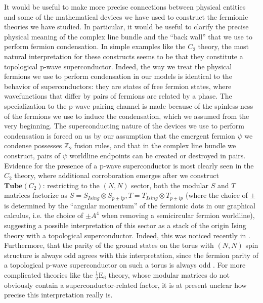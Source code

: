\documentclass[12pt,a4paper]{article}
\newcommand{\tp}{\otimes}
\newcommand{\zt}{\mathbb{Z}_2}
\newcommand{\tube}{\textbf{Tube}}
\newcommand{\halfesix}{\frac{1}{2}\text{E}_6}
\begin{document}
It would be useful to make more precise connections between physical entities and some of the mathematical 
devices we have used to construct the fermionic theories 
we have studied. 
In particular, it would be useful to clarify the precise physical meaning of the complex line bundle 
and the ``back wall'' that we use to perform fermion condensation. 
In simple examples like the $C_2$ theory, the most natural interpretation for these constructs 
seems to be that they constitute a topological p-wave superconductor.
Indeed, the way we treat the physical fermions we use to perform condensation 
in our models is identical to the behavior of 
superconductors: they are states of 
free fermion states, where wavefunctions that differ by pairs of 
fermions are related by a phase. 
The specialization to the p-wave pairing channel is made because of the spinless-ness
of the fermions we use to induce the condensation, which we assumed from the very 
beginning.  
The superconducting nature of the devices we use to perform condensation is forced on us
by our assumption that the emergent fermion $\psi$ we condense possesses $\zt$
fusion rules, and that in the complex line bundle we construct, pairs of
$\psi$ worldline endpoints can be created or destroyed in pairs. 
Evidence for the presence of a p-wave superconductor is most clearly seen in the $C_2$ theory, 
where additional corroboration emerges after we construct $\tube(C_2)$: 
restricting to the $(N,N)$ sector, both the modular $S$ and $T$ matrices 
factorize as $S=S_{Ising}\tp S_{p\pm ip}, T = T_{Ising} \tp T_{p\pm ip}$ (where the 
choice of $\pm$ is determined by the ``angular momentum'' of the fermionic dots 
in our graphical calculus, i.e. the choice of $\pm A^4$ when removing a semicircular fermion
worldline), suggesting a possible interpretation of this sector 
as a stack of the origin Ising theory with a topological superconductor. 
Indeed, this was noticed recently in \cite{ware2016}.
Furthermore, that the parity of the ground states on the torus with $(N,N)$ spin structure is always 
odd agrees with this interpretation, since the fermion parity of a topological 
p-wave superconductor on such a torus is always odd \cite{you2015}.
For more
complicated theories like the $\halfesix$ theory, whose modular matrices do not obviously contain a superconductor-related factor, 
it is at present unclear how precise this interpretation really is. 

\end{document}
